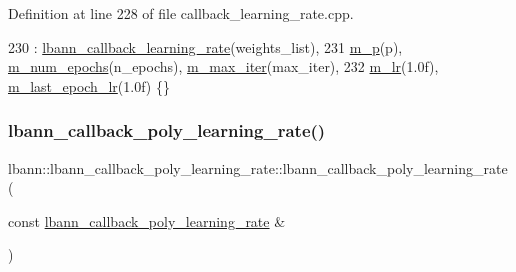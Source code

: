 Definition at line 228 of file callback\+\_\+learning\+\_\+rate.\+cpp.


\begin{DoxyCode}
230   : \hyperlink{classlbann_1_1lbann__callback__learning__rate_a69687cd55f4d09c480e08e18488519fe}{lbann\_callback\_learning\_rate}(weights\_list),
231     \hyperlink{classlbann_1_1lbann__callback__poly__learning__rate_a03c8c9a738036f9b778f11416112fd80}{m\_p}(p), \hyperlink{classlbann_1_1lbann__callback__poly__learning__rate_a493de3bbdea4bed802e663af9b81af8e}{m\_num\_epochs}(n\_epochs), \hyperlink{classlbann_1_1lbann__callback__poly__learning__rate_a43c06187577baff885bda6177fe56c3f}{m\_max\_iter}(max\_iter),
232     \hyperlink{classlbann_1_1lbann__callback__poly__learning__rate_a02cb265abba03e10fcba2be3cbbafce4}{m\_lr}(1.0f), \hyperlink{classlbann_1_1lbann__callback__poly__learning__rate_aad95c34cfb705392bf38ecbb0dc97b32}{m\_last\_epoch\_lr}(1.0f) \{\}
\end{DoxyCode}
\mbox{\label{classlbann_1_1lbann__callback__poly__learning__rate_a9c55d816c11b6c79d0bbc145e7211995}} 
\subsubsection{\texorpdfstring{lbann\+\_\+callback\+\_\+poly\+\_\+learning\+\_\+rate()}{lbann\_callback\_poly\_learning\_rate()}\hspace{0.1cm}{\footnotesize\ttfamily [3/3]}}
{\footnotesize\ttfamily lbann\+::lbann\+\_\+callback\+\_\+poly\+\_\+learning\+\_\+rate\+::lbann\+\_\+callback\+\_\+poly\+\_\+learning\+\_\+rate (\begin{DoxyParamCaption}\item[{const \hyperlink{classlbann_1_1lbann__callback__poly__learning__rate}{lbann\+\_\+callback\+\_\+poly\+\_\+learning\+\_\+rate} \&}]{ }\end{DoxyParamCaption})\hspace{0.3cm}{\ttfamily [default]}}



